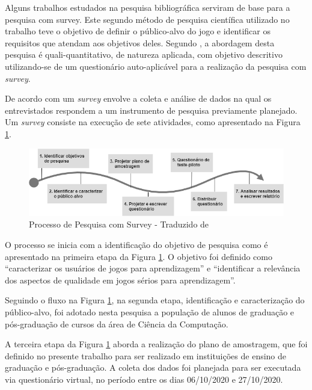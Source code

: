 Alguns trabalhos estudados \cite{Petri_Wangenheim_2019, deSales_SousaeSilva_2020} na pesquisa bibliográfica serviram de base para a pesquisa com survey. Este segundo método de pesquisa científica utilizado no trabalho teve o objetivo de definir o público-alvo do jogo e identificar os requisitos que atendam aos objetivos deles. Segundo , a abordagem desta pesquisa é quali-quantitativo, de natureza aplicada, com objetivo descritivo utilizando-se de um questionário auto-aplicável para a realização da pesquisa com \textit{survey}. 

De acordo com  um \textit{survey} envolve a coleta e análise de dados na qual os entrevistados respondem a um instrumento de pesquisa previamente planejado. Um \textit{survey} consiste na execução de sete atividades, como apresentado na Figura \ref{Fig:survey_flow.png}.

\begin{figure}[htbp]
	\centering
	\includegraphics[keepaspectratio=true,scale=0.6]{figuras/metodologia/flow_survey.png}
	\caption{Processo de Pesquisa com Survey - Traduzido de }
	\label{Fig:survey_flow.png}
\end{figure}

O processo se inicia com a identificação do objetivo de pesquisa como é apresentado na primeira etapa da Figura \ref{Fig:survey_flow.png}. O objetivo foi definido como ``caracterizar os usuários de jogos para aprendizagem'' e ``identificar a relevância dos aspectos de qualidade em jogos sérios para aprendizagem''. 

Seguindo o fluxo na Figura \ref{Fig:survey_flow.png}, na segunda etapa, identificação e caracterização do público-alvo, foi adotado nesta pesquisa a população de alunos de graduação e pós-graduação de cursos da área de Ciência da Computação. 

A terceira etapa da Figura \ref{Fig:survey_flow.png} aborda a realização do plano de amostragem, que foi definido no presente trabalho para ser realizado em instituições de ensino de graduação e pós-graduação. A coleta dos dados foi planejada para ser executada via questionário virtual, no período entre os dias 06/10/2020 e 27/10/2020. 

